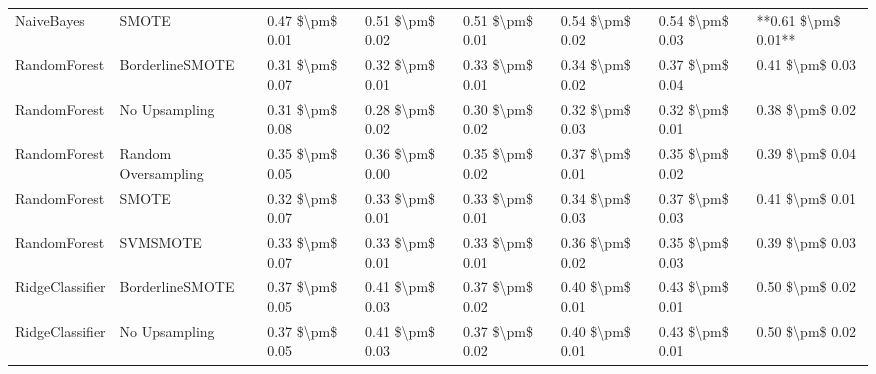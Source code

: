 \begin{tabular}{llllllll}
                     NaiveBayes &                         SMOTE & 0.47 \$\textbackslash pm\$ 0.01 &           0.51 \$\textbackslash pm\$ 0.02 &       0.51 \$\textbackslash pm\$ 0.01 &        0.54 \$\textbackslash pm\$ 0.02 &                         0.54 \$\textbackslash pm\$ 0.03 & **0.61 \$\textbackslash pm\$ 0.01** \\
                   RandomForest &               BorderlineSMOTE & 0.31 \$\textbackslash pm\$ 0.07 &           0.32 \$\textbackslash pm\$ 0.01 &       0.33 \$\textbackslash pm\$ 0.01 &        0.34 \$\textbackslash pm\$ 0.02 &                         0.37 \$\textbackslash pm\$ 0.04 &     0.41 \$\textbackslash pm\$ 0.03 \\
                   RandomForest &                 No Upsampling & 0.31 \$\textbackslash pm\$ 0.08 &           0.28 \$\textbackslash pm\$ 0.02 &       0.30 \$\textbackslash pm\$ 0.02 &        0.32 \$\textbackslash pm\$ 0.03 &                         0.32 \$\textbackslash pm\$ 0.01 &     0.38 \$\textbackslash pm\$ 0.02 \\
                   RandomForest &           Random Oversampling & 0.35 \$\textbackslash pm\$ 0.05 &           0.36 \$\textbackslash pm\$ 0.00 &       0.35 \$\textbackslash pm\$ 0.02 &        0.37 \$\textbackslash pm\$ 0.01 &                         0.35 \$\textbackslash pm\$ 0.02 &     0.39 \$\textbackslash pm\$ 0.04 \\
                   RandomForest &                         SMOTE & 0.32 \$\textbackslash pm\$ 0.07 &           0.33 \$\textbackslash pm\$ 0.01 &       0.33 \$\textbackslash pm\$ 0.01 &        0.34 \$\textbackslash pm\$ 0.03 &                         0.37 \$\textbackslash pm\$ 0.03 &     0.41 \$\textbackslash pm\$ 0.01 \\
                   RandomForest &                      SVMSMOTE & 0.33 \$\textbackslash pm\$ 0.07 &           0.33 \$\textbackslash pm\$ 0.01 &       0.33 \$\textbackslash pm\$ 0.01 &        0.36 \$\textbackslash pm\$ 0.02 &                         0.35 \$\textbackslash pm\$ 0.03 &     0.39 \$\textbackslash pm\$ 0.03 \\
                RidgeClassifier &               BorderlineSMOTE & 0.37 \$\textbackslash pm\$ 0.05 &           0.41 \$\textbackslash pm\$ 0.03 &       0.37 \$\textbackslash pm\$ 0.02 &        0.40 \$\textbackslash pm\$ 0.01 &                         0.43 \$\textbackslash pm\$ 0.01 &     0.50 \$\textbackslash pm\$ 0.02 \\
                RidgeClassifier &                 No Upsampling & 0.37 \$\textbackslash pm\$ 0.05 &           0.41 \$\textbackslash pm\$ 0.03 &       0.37 \$\textbackslash pm\$ 0.02 &        0.40 \$\textbackslash pm\$ 0.01 &                         0.43 \$\textbackslash pm\$ 0.01 &     0.50 \$\textbackslash pm\$ 0.02 \\

\end{tabular}
